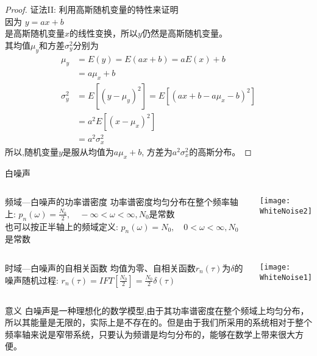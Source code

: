 \begin{frame}
\begin{proof}
证法II: 利用高斯随机变量的特性来证明\\
因为  $y=ax+b$ \\
是高斯随机变量$x$的线性变换，所以$y$仍然是高斯随机变量。\\
其均值$\mu_y$和方差$\sigma_y^2$分别为
\begin{align*}
\mu_y&=E(y)=E(ax+b)=aE(x)+b\\
&=a\mu_x+b\\
\sigma_y^2&=E[(y-\mu_y)^2]=E[(ax+b-a\mu_x-b)^2]\\
&=a^2E[(x-\mu_x)^2]\\
&=a^2\sigma_x^2
\end{align*}
所以,随机变量$y$是服从均值为$a\mu_x+b$, 方差为$a^2\sigma_x^2$的高斯分布。
\end{proof}
\end{frame}

\begin{frame}{白噪声}
\small
\begin{columns}%
	\begin{block}{频域---白噪声的功率谱密度}
	功率谱密度均匀分布在整个频率轴上: $p_n(\omega)=\frac{N_0}{2},\quad -\infty<\omega< \infty, N_0$是常数\\
	也可以按正半轴上的频域定义: $p_n(\omega)=N_0,\quad 0<\omega<\infty, N_0$是常数
	\end{block}
    \texttt{[image: WhiteNoise2]}
\end{columns}

\begin{columns}%
	\begin{block}{时域---白噪声的自相关函数}
	均值为零、自相关函数$r_n(\tau)$为$\delta$的噪声随机过程: $r_n(\tau)=IFT[\frac{N_0}{2}]=\frac{N_0}{2}\delta(\tau)$
	\end{block}
	\texttt{[image: WhiteNoise1]}
\end{columns}
\begin{block}{意义}
	白噪声是一种理想化的数学模型,由于其功率谱密度在整个频域上均匀分布，所以其能量是无限的，实际上是不存在的。但是由于我们所采用的系统相对于整个频率轴来说是窄带系统，只要认为频谱是均匀分布的，能够在数学上带来很大方便。
\end{block}
\end{frame}

